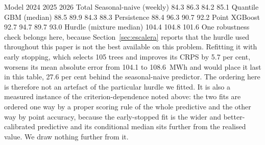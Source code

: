\documentclass[preprint,3p,times]{elsarticle}
\providecommand{\DIFaddtex}[1]{{\protect\color{blue} \sf #1}} %
\providecommand{\DIFdeltex}[1]{{\protect\color{red} \scriptsize #1}} %
\providecommand{\DIFaddbegin}{} %
\providecommand{\DIFaddend}{} %
\providecommand{\DIFdelbegin}{} %
\providecommand{\DIFdelend}{} %
\providecommand{\DIFaddFL}[1]{\DIFadd{#1}} %
\providecommand{\DIFdelFL}[1]{\DIFdel{#1}} %
\providecommand{\DIFaddbeginFL}{} %
\providecommand{\DIFaddendFL}{} %
\providecommand{\DIFdelbeginFL}{} %
\providecommand{\DIFdelendFL}{} %
\providecommand{\DIFadd}[1]{\texorpdfstring{\DIFaddtex{#1}}{#1}} %
\providecommand{\DIFdel}[1]{\texorpdfstring{\DIFdeltex{#1}}{}} %
\begin{document}
\DIFdelbegin %
\DIFdelFL{Model }%
\DIFdelFL{2024 }%
\DIFdelFL{2025 }%
\DIFdelFL{2026 }%
\DIFdelFL{Total }%
\DIFdelFL{Seasonal-naive (weekly)      }%
\DIFdelFL{84.3 }%
\DIFdelFL{86.3 }%
\DIFdelFL{84.2 }%
\DIFdelFL{85.1 }%
\DIFdelFL{Quantile GBM (median)        }%
\DIFdelFL{88.5 }%
\DIFdelFL{89.9 }%
\DIFdelFL{84.3 }%
\DIFdelFL{88.3 }%
\DIFdelFL{Persistence                  }%
\DIFdelFL{88.4 }%
\DIFdelFL{96.3 }%
\DIFdelFL{90.7 }%
\DIFdelFL{92.2 }%
\DIFdelFL{Point XGBoost                }%
\DIFdelFL{92.7 }%
\DIFdelFL{94.7 }%
\DIFdelFL{89.7 }%
\DIFdelFL{93.0 }%
\DIFdelFL{Hurdle (mixture median)      }%
\DIFdelFL{104.4 }%
\DIFdelFL{104.8 }%
\DIFdelFL{101.6 }%
\DIFdelendFL \DIFaddbeginFL \DIFaddFL{One robustness check belongs here, because Section~\ref{sec:escalera} reports that the hurdle used throughout this paper is not the best available on this problem. Refitting it with early stopping, which selects 105 trees and improves its CRPS by 5.7 per cent, worsens its mean absolute error from }\DIFaddendFL 104.1 \DIFdelbeginFL %
\DIFdelend \DIFaddbegin \DIFadd{to 108.6~MWh and would place it last in this table, 27.6 per cent behind the seasonal-naive predictor. The ordering here is therefore not an artefact of the particular hurdle we fitted. It is also a measured instance of the criterion-dependence noted above: the two fits are ordered one way by a proper scoring rule of the whole predictive and the other way by point accuracy, because the early-stopped fit is the wider and better-calibrated predictive and its conditional median sits further from the realised value. We draw nothing further from it.
}\DIFaddend 
\end{document}
